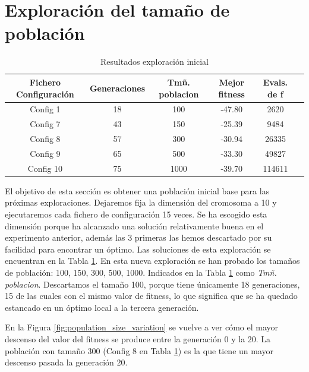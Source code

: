 \section{Exploración del tamaño de población}

\begin{table}[]
    \centering
    \begin{tabular}{||c|c|c|c|c|c||}
        \hline
        \textbf{Fichero Configuración} & \textbf{Generaciones} & \textbf{Tmñ. poblacion} & \textbf{Mejor fitness} & \textbf{Evals. de f}\\ \hline
        Config 1   & 18    & 100   & -47.80    &  2620   \\ \hline
        Config 7   & 43    & 150   & -25.39    &  9484   \\ \hline
        Config 8   & 57    & 300   & -30.94    &  26335  \\ \hline
        Config 9   & 65    & 500   & -33.30    &  49827  \\ \hline
        Config 10  & 75    & 1000  & -39.70    &  114611 \\ \hline
    \end{tabular}
    \caption{Resultados exploración inicial}
    \label{tab:base_population}
\end{table}

El objetivo de esta sección es obtener una población inicial base para las próximas exploraciones. Dejaremos fija la dimensión del cromosoma a 10 y
ejecutaremos cada fichero de configuración 15 veces. Se ha escogido esta dimensión porque ha alcanzado una solución 
relativamente buena en el experimento anterior, además las 3 primeras las hemos descartado por su facilidad para encontrar un 
óptimo. Las soluciones de esta exploración se encuentran en la Tabla \ref{tab:base_population}. En esta nueva exploración se 
han probado los tamaños de población: 100, 150, 300, 500, 1000. Indicados en la Tabla \ref{tab:base_population}
como \textit{Tmñ. poblacion}. Descartamos el tamaño 100, porque tiene únicamente 18 generaciones, 15 de las cuales con el mismo
valor de fitness, lo que significa que se ha quedado estancado en un óptimo local a la tercera generación.

En la Figura \ref{fig:population_size_variation} se vuelve a ver cómo el mayor descenso del valor del fitness se produce
entre la generación 0 y la 20. La población con tamaño 300 (Config 8 en Tabla \ref{tab:base_population}) es la que tiene
un mayor descenso pasada la generación 20. 

